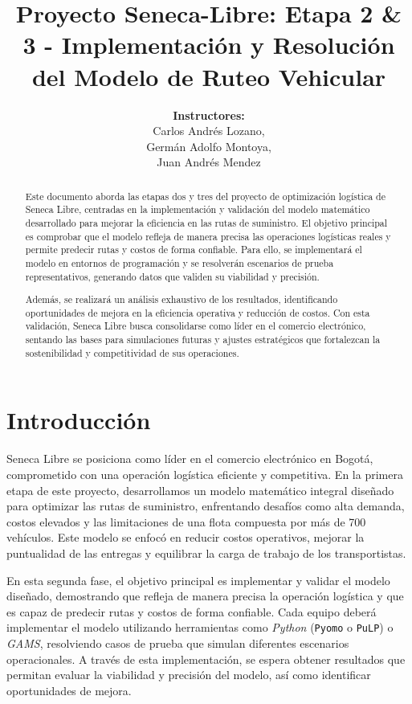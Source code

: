 \documentclass[12pt]{article}
\title{Proyecto Seneca-Libre: Etapa 2 \& 3 - Implementación y Resolución del Modelo de Ruteo Vehicular}
\author{\textbf{Instructores:} \\
Carlos Andrés Lozano, \\
Germán Adolfo Montoya, \\
Juan Andrés Mendez}
\date{}
\begin{document}
\maketitle

\begin{abstract}
Este documento aborda las etapas dos y tres del proyecto de optimización logística de Seneca Libre, centradas en la implementación y validación del modelo matemático desarrollado para mejorar la eficiencia en las rutas de suministro. El objetivo principal es comprobar que el modelo refleja de manera precisa las operaciones logísticas reales y permite predecir rutas y costos de forma confiable. Para ello, se implementará el modelo en entornos de programación y se resolverán escenarios de prueba representativos, generando datos que validen su viabilidad y precisión.

Además, se realizará un análisis exhaustivo de los resultados, identificando oportunidades de mejora en la eficiencia operativa y reducción de costos. Con esta validación, Seneca Libre busca consolidarse como líder en el comercio electrónico, sentando las bases para simulaciones futuras y ajustes estratégicos que fortalezcan la sostenibilidad y competitividad de sus operaciones.
\end{abstract}

\section{Introducción}
Seneca Libre se posiciona como líder en el comercio electrónico en Bogotá, comprometido con una operación logística eficiente y competitiva. En la primera etapa de este proyecto, desarrollamos un modelo matemático integral diseñado para optimizar las rutas de suministro, enfrentando desafíos como alta demanda, costos elevados y las limitaciones de una flota compuesta por más de 700 vehículos. Este modelo se enfocó en reducir costos operativos, mejorar la puntualidad de las entregas y equilibrar la carga de trabajo de los transportistas.

En esta segunda fase, el objetivo principal es implementar y validar el modelo diseñado, demostrando que refleja de manera precisa la operación logística y que es capaz de predecir rutas y costos de forma confiable. Cada equipo deberá implementar el modelo utilizando herramientas como \textit{Python} (\texttt{Pyomo} o \texttt{PuLP}) o \textit{GAMS}, resolviendo casos de prueba que simulan diferentes escenarios operacionales. A través de esta implementación, se espera obtener resultados que permitan evaluar la viabilidad y precisión del modelo, así como identificar oportunidades de mejora.
\end{document}
